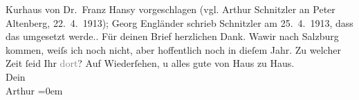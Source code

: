 \begin{ledgroupsized}[t]{13cm}
{{{                     Kurhaus von Dr. Franz Hansy vorgeschlagen (vgl. Arthur Schnitzler an Peter Altenberg, 22. 4. 1913); Georg Engländer schrieb Schnitzler am 25. 4. 1913, dass das umgesetzt werde.}}}\label{K_L02132-1h}.\pend
           \pstart
           Für deinen Brief herzlichen Dank. Wa{\geminationn}{\pb}wir nach Salzburg kommen, weiſs ich noch nicht, aber
               hoffentlich noch in dieſem Jahr. Zu welcher Zeit ſeid Ihr
               \textcolor{gray}{dort}?\pend
           \pstart
           Auf Wiederſehen, u alles gute von Haus zu Haus.{\\[\baselineskip]}Dein{\\[\baselineskip]}\spacefill\mbox{Arthur}\pend
           \leftskip=0em{}
         
         \endnumbering{}\end{ledgroupsized}  \newcommand{\dateiname}{L02132}\newcommand{\titel}{Arthur Schnitzler an Hermann Bahr, 2[5]. 4. 1913}\newcommand{\editorInnen}{ Kurt Ifkovits,  Martin Anton Müller}
      
